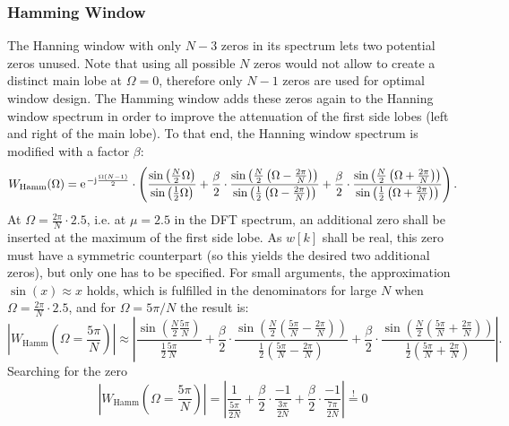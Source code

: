 \documentclass[11pt,a4paper,DIV=12]{scrartcl}
\begin{document}
\subsubsection{Hamming Window}
The Hanning window with only $N-3$ zeros in its spectrum lets two potential
zeros unused.
%
Note that using all possible $N$ zeros would not allow to create a distinct main
lobe at $\Omega=0$, therefore only $N-1$ zeros are used for optimal window
design.
%
The Hamming window adds these zeros again to the Hanning window spectrum in
order to improve the attenuation of the first side lobes (left and right of
the main lobe).
%
To that end, the Hanning window spectrum is modified with a factor $\beta$:
%
\begin{equation}
W_{\text{Hamm}}(\Omega)=\e^{-\im\frac{\Omega(N-1)}{2}}\cdot\left(\frac{\sin\left(\frac{N}{2}\Omega\right)}{\sin\left(\frac{1}{2}\Omega\right)}+\frac{\beta}{2}\cdot\frac{\sin\left(\frac{N}{2}\left(\Omega-\frac{2\pi}{N}\right)\right)}{\sin\left(\frac{1}{2}\left(\Omega-\frac{2\pi}{N}\right)\right)}+\frac{\beta}{2}\cdot\frac{\sin\left(\frac{N}{2}\left(\Omega+\frac{2\pi}{N}\right)\right)}{\sin\left(\frac{1}{2}\left(\Omega+\frac{2\pi}{N}\right)\right)}\right).
\end{equation}
%
At $\Omega=\frac{2\pi}{N}\cdot2.5$, i.e. at $\mu=2.5$ in the DFT spectrum, an
additional zero shall be inserted at the maximum of the first side lobe.
%
As $w[k]$ shall be real, this zero must have a symmetric counterpart (so this
yields the desired two additional zeros), but only one has to be specified.
%
For small arguments, the approximation $\sin(x)\approx x$ holds, which is
fulfilled in the denominators for large $N$ when $\Omega=\frac{2\pi}{N}\cdot2.5$,
and for $\Omega=5\pi/N$ the result is:
%
\begin{equation}
\left|W_{\text{Hamm}}(\Omega=\frac{5\pi}{N})\right|\approx\left|\frac{\sin\left(\frac{N}{2}\frac{5\pi}{N}\right)}{\frac{1}{2}\frac{5\pi}{N}}+\frac{\beta}{2}\cdot\frac{\sin\left(\frac{N}{2}\left(\frac{5\pi}{N}-\frac{2\pi}{N}\right)\right)}{\frac{1}{2}\left(\frac{5\pi}{N}-\frac{2\pi}{N}\right)}+\frac{\beta}{2}\cdot\frac{\sin\left(\frac{N}{2}\left(\frac{5\pi}{N}+\frac{2\pi}{N}\right)\right)}{\frac{1}{2}\left(\frac{5\pi}{N}+\frac{2\pi}{N}\right)}\right|.
\end{equation}
%
Searching for the zero
%
\begin{equation}
\left|W_{\text{Hamm}}(\Omega=\frac{5\pi}{N})\right|=\left|\frac{1}{\frac{5\pi}{2N}}+\frac{\beta}{2}\cdot\frac{-1}{\frac{3\pi}{2N}}+\frac{\beta}{2}\cdot\frac{-1}{{\frac{7\pi}{2N}}}\right|\stackrel{!}{=}0
\end{equation}
\end{document}
